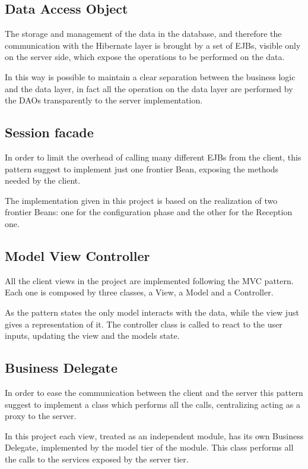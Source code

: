 \documentclass [11pt]{article}
\begin{document}
\subsection{Data Access Object}
The storage and management of the data in the database, and therefore the
communication with the Hibernate layer is brought by a set of EJBs,
visible only on the server side, which expose the operations to be
performed on the data.

In this way is possible to maintain a clear separation between the
business logic and the data layer, in fact all the operation on the data
layer are performed by the DAOs transparently to the server
implementation.

\subsection{Session facade}
In order to limit the overhead of calling many different EJBs from the
client, this pattern suggest to implement just one frontier Bean, exposing
the methods needed by the client.

The implementation given in this project is based on the realization of
two frontier Beans: one for the configuration phase and the other for the
Reception one.

\subsection {Model View Controller}
All the client views in the project are implemented following the MVC
pattern. Each one is composed by three classes, a View, a Model and a
Controller.

As the pattern states the only model interacts with the data, while the
view just gives a representation of it.
The controller class is called to react to the user inputs, updating the
view and the models state.

\subsection{Business Delegate}
In order to ease the communication between the client and the server this
pattern suggest to implement a class which performs all the calls,
centralizing acting as a proxy to the server.

In this project each view, treated as an independent module, has its own
Business Delegate, implemented by the model tier of the module. This class
performs all the calls to the services exposed by the server tier.
\end{document}
